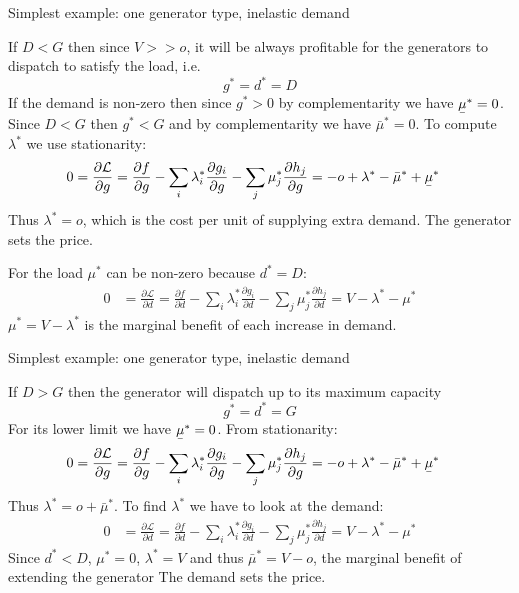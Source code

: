 \documentclass[10pt,aspectratio=169,dvipsnames]{beamer}
\def\l{\lambda}
\def\m{\mu}
\def\d{\partial}
\def\cL{\mathcal{L}}
\newcommand{\ubar}[1]{\text{\b{$#1$}}}
\begin{document}
\begin{frame}{Simplest example: one generator type, inelastic demand}

  If $D < G$ then since $V >> o$, it will be always profitable for the
  generators to dispatch to satisfy the load, i.e.
  \begin{equation*}
    g^* = d^* = D
  \end{equation*}
  If the demand is non-zero then since $g^* > 0$ by complementarity we
  have $\ubar{\m}^* = 0$. Since $D < G$ then $g^* < G$ and
  by complementarity we have $\bar{\m}^* = 0$. To compute $\l^*$ we use stationarity:
  \begin{align*}
    0 & = \frac{\d \cL}{\d g } =   \frac{\d f}{\d g} - \sum_i \l_i^* \frac{\d g_i}{\d g}  - \sum_j \m_j^* \frac{\d h_j}{\d g} = - o + \l^* - \bar{\m}^* + \ubar{\m}^*
  \end{align*}
  Thus $\l^* = o$, which is the cost per unit of supplying extra demand. The \alert{generator sets the price}.

  For the load $\m^*$ can be non-zero because $d^*=D$:
    \begin{align*}
      0 & = \frac{\d \cL}{\d d} =   \frac{\d f}{\d d} - \sum_i \l_i^* \frac{\d g_i}{\d d}  - \sum_j \m_j^* \frac{\d h_j}{\d d} = V - \l^* - \m^*
    \end{align*}
    $\m^* = V - \l^*$ is the marginal benefit of each increase in demand.
\end{frame}


\begin{frame}{Simplest example: one generator type, inelastic demand}

  If $D > G$ then the generator will dispatch up to its maximum capacity
  \begin{equation*}
    g^* = d^* = G
  \end{equation*}
  For its lower limit we have $\ubar{\m}^* = 0$. From stationarity:
  \begin{align*}
    0 & = \frac{\d \cL}{\d g } =   \frac{\d f}{\d g} - \sum_i \l_i^* \frac{\d g_i}{\d g}  - \sum_j \m_j^* \frac{\d h_j}{\d g} = - o + \l^* - \bar{\m}^* + \ubar{\m}^*
  \end{align*}
  Thus $\l^* = o + \bar{\m}^*$. To find $\l^*$ we have to look at the demand:
    \begin{align*}
      0 & = \frac{\d \cL}{\d d} =   \frac{\d f}{\d d} - \sum_i \l_i^* \frac{\d g_i}{\d d}  - \sum_j \m_j^* \frac{\d h_j}{\d d} = V - \l^* - \m^*
    \end{align*}
  Since $d^* < D$, $\m^* = 0$, $\l^* = V$ and thus $\bar{\m}^* = V-o$, the marginal benefit of extending the generator The \alert{demand sets the price}.

\end{frame}
\end{document}

